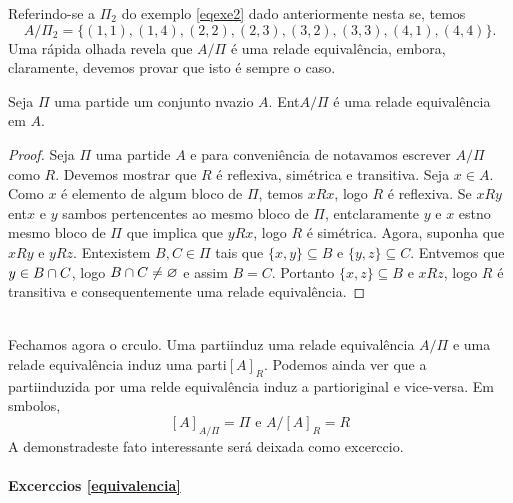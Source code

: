 Referindo-se a $\Pi_2$ do exemplo \ref{eqexe2} dado anteriormente nesta se\caoi, temos
\[
A/\Pi_2=\{(1,1),(1,4),(2,2),(2,3),(3,2),(3,3),(4,1),(4,4)\}.
\]
Uma r\'apida olhada revela que $A/\Pi$ \'e uma rela\cao de equival\^encia, embora, claramente, devemos provar que isto \'e sempre o caso.
\begin{teob}
Seja $\Pi$ uma parti\cao de um conjunto n\ao vazio $A$. Ent\ao $A/\Pi$ \'e uma rela\cao de equival\^encia em $A$.
\end{teob}
\begin{proof}
Seja $\Pi$ uma parti\cao de $A$ e para conveni\^encia de nota\cao vamos escrever $A/\Pi$ como $R$. Devemos mostrar que $R$ \'e reflexiva, sim\'etrica e transitiva. Seja $x\in A$. Como $x$ \'e elemento de algum bloco de $\Pi$, temos $xRx$, logo $R$ \'e reflexiva. Se $xRy$ ent\ao $x$ e $y$ s\ao ambos pertencentes ao mesmo bloco de $\Pi$, ent\ao claramente $y$ e $x$ est\ao no mesmo bloco de $\Pi$ que implica que $yRx$, logo $R$ \'e sim\'etrica. Agora, suponha que $xRy$ e $yRz$. Ent\ao existem $B,C\in\Pi$ tais que $\{x,y\}\subseteq B$ e $\{y,z\}\subseteq C$. Ent\ao vemos que $y\in B\cap C$, logo $B\cap C\neq\varnothing$ e assim $B=C$. Portanto $\{x,z\}\subseteq B$ e $xRz$, logo $R$ \'e transitiva e consequentemente uma rela\cao de equival\^encia. 
\end{proof}
\\

Fechamos agora o c\ih rculo. Uma parti\cao induz uma rela\cao de equival\^encia $A/\Pi$ e uma rela\cao de equival\^encia induz uma parti\cao $[A]_R$. Podemos ainda ver que a parti\cao induzida por uma rel\cao de equival\^encia induz a parti\cao original e vice-versa. Em s\ih mbolos,
\[
[A]_{A/\Pi}=\Pi \textrm{ e } A/[A]_R=R
\]
A demonstra\cao deste fato interessante ser\'a deixada como excerc\ih cio.

\paragraph{Excerc\ih cios \ref{equivalencia}}

